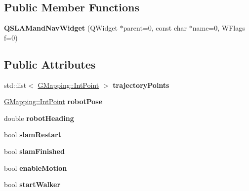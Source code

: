 \subsection*{Public Member Functions}
\begin{DoxyCompactItemize}
\item 
\mbox{\label{classQSLAMandNavWidget_abd2ec5b29152dc0383d25654ffdb46ae}} 
{\bfseries Q\+S\+L\+A\+Mand\+Nav\+Widget} (Q\+Widget $\ast$parent=0, const char $\ast$name=0, W\+Flags f=0)
\end{DoxyCompactItemize}
\subsection*{Public Attributes}
\begin{DoxyCompactItemize}
\item 
\mbox{\label{classQSLAMandNavWidget_a1fc20db6aefc34cc5b281a34d4d08531}} 
std\+::list$<$ \hyperlink{structGMapping_1_1point}{G\+Mapping\+::\+Int\+Point} $>$ {\bfseries trajectory\+Points}
\item 
\mbox{\label{classQSLAMandNavWidget_af1f937d7253801600379699a06864eaa}} 
\hyperlink{structGMapping_1_1point}{G\+Mapping\+::\+Int\+Point} {\bfseries robot\+Pose}
\item 
\mbox{\label{classQSLAMandNavWidget_ae93b5254d71807bf05007a4b99d44791}} 
double {\bfseries robot\+Heading}
\item 
\mbox{\label{classQSLAMandNavWidget_aab1066a2471f809f5fa9ea620567c2f5}} 
bool {\bfseries slam\+Restart}
\item 
\mbox{\label{classQSLAMandNavWidget_a4ad3e195be817de5d5d7cd50058a2345}} 
bool {\bfseries slam\+Finished}
\item 
\mbox{\label{classQSLAMandNavWidget_a4b6e0b988759d7738f496b8671300852}} 
bool {\bfseries enable\+Motion}
\item 
\mbox{\label{classQSLAMandNavWidget_a2aacebf78a4ba3f9f7a2ce95f3c5800a}} 
bool {\bfseries start\+Walker}
\item 

\end{DoxyCompactItemize}
